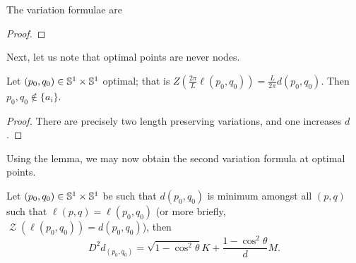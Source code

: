 \documentclass[11pt]{amsart}
\DeclareMathOperator{\chordarcprofile}{\mathcal{Z}}
\begin{document}
\begin{lemma}
The variation formulae are
\end{lemma}

\begin{proof}

\end{proof}

Next, let us note that optimal points are never nodes.

\begin{lemma}
Let \((p_0,q_0) \in \mathbb{S}^1 \times \mathbb{S}^1\) optimal; that is \(Z(\tfrac{2\pi}{L}\ell(p_0,q_0)) = \tfrac{L}{2\pi} d(p_0, q_0)\). Then \(p_0,q_0 \notin \{a_i\}\).
\end{lemma}

\begin{proof}
There are precisely two length preserving variations, and one increases \(d\).
\end{proof}

Using the lemma, we may now obtain the second variation formula at optimal points.

\begin{prop}
\label{prop:spatial_var}
Let $(p_0, q_0) \in \mathbb{S}^1 \times \mathbb{S}^1$ be such that $d(p_0, q_0)$ is minimum amongst all $(p,q)$ such that $\ell(p, q) = \ell(p_0, q_0)$ (or more briefly, $\chordarcprofile(\ell(p_0,q_0)) = d(p_0, q_0)$), then 
\[
D^2d_{(p_0,q_0)} =  \sqrt{1-\cos^2\theta}K + \frac{1-\cos^2 \theta}{d} M.
\]
\end{prop}
\end{document}
